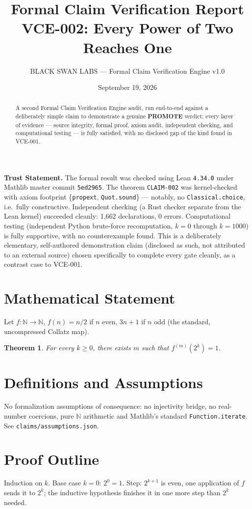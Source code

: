 \documentclass[11pt]{article}
\title{Formal Claim Verification Report\\[4pt]\large VCE-002: Every Power of Two Reaches One}
\author{BLACK SWAN LABS --- Formal Claim Verification Engine v1.0}
\date{September 19, 2026}
\newtheorem{theorem}{Theorem}
\begin{document}
\maketitle

\noindent\textbf{Trust Statement.} The formal result was checked using Lean \texttt{4.34.0} under Mathlib master commit \texttt{5ed2965}. The theorem \texttt{CLAIM-002} was kernel-checked with axiom footprint \{\texttt{propext}, \texttt{Quot.sound}\} --- notably, no \texttt{Classical.choice}, i.e.\ fully constructive. Independent checking (a Rust checker separate from the Lean kernel) succeeded cleanly: 1{,}662 declarations, 0 errors. Computational testing (independent Python brute-force recomputation, $k=0$ through $k=1000$) is fully supportive, with no counterexample found. This is a deliberately elementary, self-authored demonstration claim (disclosed as such, not attributed to an external source) chosen specifically to complete every gate cleanly, as a contrast case to VCE-001.

\begin{abstract}
A second Formal Claim Verification Engine audit, run end-to-end against a
deliberately simple claim to demonstrate a genuine \textbf{PROMOTE} verdict:
every layer of evidence --- source integrity, formal proof, axiom audit,
independent checking, and computational testing --- is fully satisfied,
with no disclosed gap of the kind found in VCE-001.
\end{abstract}

\section{Mathematical Statement}
Let $f:\mathbb{N}\to\mathbb{N}$, $f(n)=n/2$ if $n$ even, $3n+1$ if $n$ odd (the standard, uncompressed Collatz map).
\begin{theorem}
For every $k \ge 0$, there exists $m$ such that $f^{(m)}(2^k) = 1$.
\end{theorem}

\section{Definitions and Assumptions}
No formalization assumptions of consequence: no injectivity bridge, no real-number coercions, pure $\mathbb{N}$ arithmetic and Mathlib's standard \texttt{Function.iterate}. See \texttt{claims/assumptions.json}.

\section{Proof Outline}
Induction on $k$. Base case $k=0$: $2^0=1$. Step: $2^{k+1}$ is even, one application of $f$ sends it to $2^k$; the inductive hypothesis finishes it in one more step than $2^k$ needed.
\end{document}
